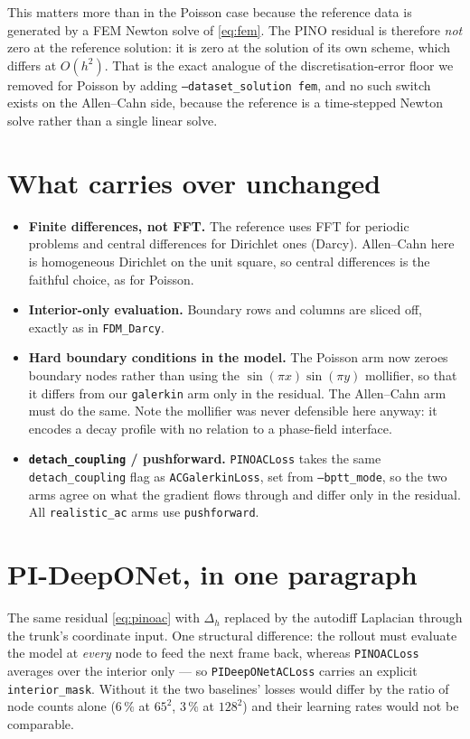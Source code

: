 \documentclass[11pt]{article}
\begin{document}
This matters more than in the Poisson case because the reference data is generated by a FEM Newton
solve of \eqref{eq:fem}. The PINO residual is therefore \emph{not} zero at the reference solution:
it is zero at the solution of its own scheme, which differs at $O(h^2)$. That is the exact analogue
of the discretisation-error floor we removed for Poisson by adding
\texttt{--dataset\_solution fem}, and no such switch exists on the Allen--Cahn side, because the
reference is a time-stepped Newton solve rather than a single linear solve.

\section{What carries over unchanged}

\begin{itemize}
  \item \textbf{Finite differences, not FFT.} The reference uses FFT for periodic problems and
  central differences for Dirichlet ones (Darcy). Allen--Cahn here is homogeneous Dirichlet on the
  unit square, so central differences is the faithful choice, as for Poisson.
  \item \textbf{Interior-only evaluation.} Boundary rows and columns are sliced off, exactly as in
  \texttt{FDM\_Darcy}.
  \item \textbf{Hard boundary conditions in the model.} The Poisson arm now zeroes boundary nodes
  rather than using the $\sin(\pi x)\sin(\pi y)$ mollifier, so that it differs from our
  \texttt{galerkin} arm only in the residual. The Allen--Cahn arm must do the same. Note the
  mollifier was never defensible here anyway: it encodes a decay profile with no relation to a
  phase-field interface.
  \item \textbf{\texttt{detach\_coupling} / pushforward.} \texttt{PINOACLoss} takes the same
  \texttt{detach\_coupling} flag as \texttt{ACGalerkinLoss}, set from \texttt{--bptt\_mode}, so the
  two arms agree on what the gradient flows through and differ only in the residual. All
  \texttt{realistic\_ac} arms use \texttt{pushforward}.
\end{itemize}

\section{PI-DeepONet, in one paragraph}

The same residual \eqref{eq:pinoac} with $\Delta_h$ replaced by the autodiff Laplacian through the
trunk's coordinate input. One structural difference: the rollout must evaluate the model at
\emph{every} node to feed the next frame back, whereas \texttt{PINOACLoss} averages over the
interior only --- so \texttt{PIDeepONetACLoss} carries an explicit \texttt{interior\_mask}. Without
it the two baselines' losses would differ by the ratio of node counts alone ($6\,\%$ at $65^2$,
$3\,\%$ at $128^2$) and their learning rates would not be comparable.
\end{document}
